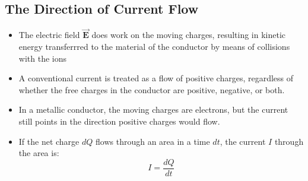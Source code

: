 \documentclass[11pt, a4paper]{article}
\begin{document}
\subsection{The Direction of Current Flow}
\begin{itemize}
    \item The electric field $\vec{\mathbf{E}}$ does work on the moving charges,
        resulting in kinetic energy transferrred to the material of the conductor by
        means of collisions with the ions
    \item A conventional current is treated as a flow of positive charges, regardless of
        whether the free charges in the conductor are positive, negative, or both.
    \item In a metallic conductor, the moving charges are electrons, but the current
        still points in the direction positive charges would flow.
    \item If the net charge $dQ$ flows through an area  in a time $dt$, the current $I$
        through the area is:
        \begin{equation}
            I = \frac{dQ}{dt}
        \end{equation}
\end{itemize}
\end{document}
